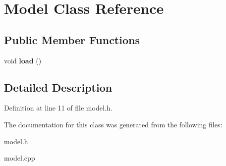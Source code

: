 \hypertarget{classModel}{}\section{Model Class Reference}
\label{classModel}
\subsection*{Public Member Functions}
\begin{DoxyCompactItemize}
\item 
void {\bfseries load} ()\hypertarget{classModel_a937f7f22c88f8c6ca549b7bb98190563}{}\label{classModel_a937f7f22c88f8c6ca549b7bb98190563}

\end{DoxyCompactItemize}


\subsection{Detailed Description}


Definition at line 11 of file model.\+h.



The documentation for this class was generated from the following files\+:\begin{DoxyCompactItemize}
\item 
model.\+h\item 
model.\+cpp\end{DoxyCompactItemize}

